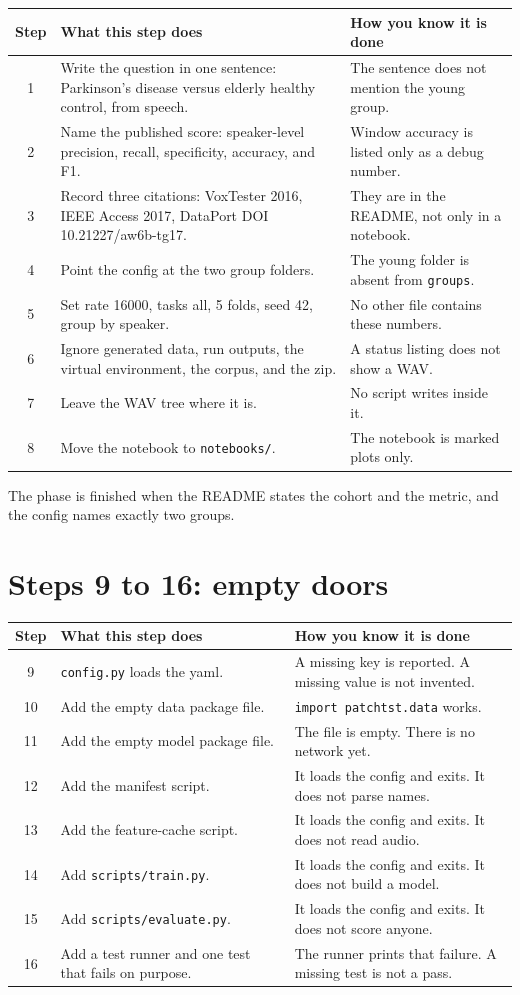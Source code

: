 \documentclass[11pt]{article}
\begin{document}
\begin{longtable}{cp{6.4cm}p{6.4cm}}
\toprule
Step & What this step does & How you know it is done \\
\midrule
\endhead
1 & Write the question in one sentence: Parkinson's disease versus elderly healthy control, from speech. & The sentence does not mention the young group. \\
2 & Name the published score: speaker-level precision, recall, specificity, accuracy, and F1. & Window accuracy is listed only as a debug number. \\
3 & Record three citations: VoxTester 2016, IEEE Access 2017, DataPort DOI 10.21227/aw6b-tg17. & They are in the README, not only in a notebook. \\
4 & Point the config at the two group folders. & The young folder is absent from \texttt{groups}. \\
5 & Set rate 16000, tasks all, 5 folds, seed 42, group by speaker. & No other file contains these numbers. \\
6 & Ignore generated data, run outputs, the virtual environment, the corpus, and the zip. & A status listing does not show a WAV. \\
7 & Leave the WAV tree where it is. & No script writes inside it. \\
8 & Move the notebook to \texttt{notebooks/}. & The notebook is marked plots only. \\
\bottomrule
\end{longtable}

The phase is finished when the README states the cohort and the metric, and the config names exactly two groups.

\section{Steps 9 to 16: empty doors}

\begin{longtable}{cp{6.4cm}p{6.4cm}}
\toprule
Step & What this step does & How you know it is done \\
\midrule
\endhead
9 & \texttt{config.py} loads the yaml. & A missing key is reported. A missing value is not invented. \\
10 & Add the empty data package file. & \texttt{import patchtst.data} works. \\
11 & Add the empty model package file. & The file is empty. There is no network yet. \\
12 & Add the manifest script. & It loads the config and exits. It does not parse names. \\
13 & Add the feature-cache script. & It loads the config and exits. It does not read audio. \\
14 & Add \texttt{scripts/train.py}. & It loads the config and exits. It does not build a model. \\
15 & Add \texttt{scripts/evaluate.py}. & It loads the config and exits. It does not score anyone. \\
16 & Add a test runner and one test that fails on purpose. & The runner prints that failure. A missing test is not a pass. \\
\bottomrule
\end{longtable}
\end{document}
